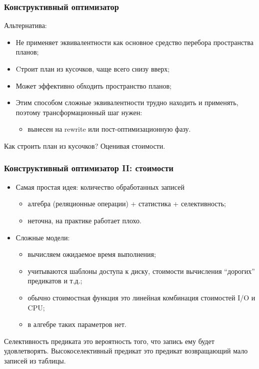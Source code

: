 \documentclass{beamer}
\begin{document}
\begin{frame}[allowframebreaks]
\frametitle{Конструктивный оптимизатор}

Альтернатива:

\begin{itemize}
  \setlength\itemsep{1em}
  \item Не применяет эквивалентности как основное средство перебора пространства планов;
  \item Cтроит план из кусочков, чаще всего снизу вверх;
  \item Может эффективно обходить пространство планов;
  \item Этим способом сложные эквивалентности трудно находить и применять, поэтому трансформационный шаг нужен:
  \begin{itemize}
    \item вынесен на rewrite или пост-оптимизационную фазу.
  \end{itemize}
  
\end{itemize}
  Как строить план из кусочков? Оценивая стоимости.

\end{frame}

\begin{frame}
\frametitle{Конструктивный оптимизатор II: стоимости}

\begin{itemize}
  \item Самая простая идея: количество обработанных записей
  \begin{itemize}
    \item алгебра (реляционные операции) + статистика + селективность;
    \item неточна, на практике работает плохо.
  \end{itemize} 
  \item Сложные модели:
  \begin{itemize}
    \item вычисляем ожидаемое время выполнения;
    \item учитываются шаблоны доступа к диску, стоимости вычисления ``дорогих'' предикатов и т.д.;
    \item обычно стоимостная функция это линейная комбинация стоимостей I/O и CPU;
    \item \alert{в алгебре таких параметров нет}.
  \end{itemize} 
  
\end{itemize}

Селективность предиката это вероятность того, что запись ему будет удовлетворять. Высокоселективный предикат это предикат возвращающий мало записей из таблицы.

\end{frame}
\end{document}
